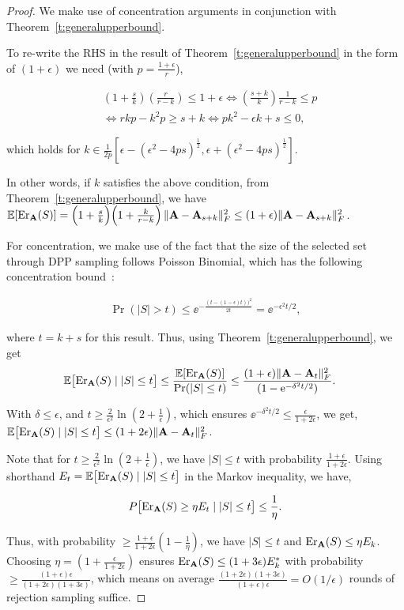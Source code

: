\documentclass{article}
\begin{document}
\begin{proof}
	We make use of concentration arguments in conjunction with Theorem~\ref{t:generalupperbound}. 
	
	To re-write the RHS in the result of Theorem~\ref{t:generalupperbound} in the form of $(1+\epsilon)$ we need (with $p=\frac{1+\epsilon}{r}$),
	
	\begin{align*}
	 & (1 + \frac{s}{k}) (\frac{r}{r-k}) \leq 1+ \epsilon  \iff \left( \frac{s+k}{k} \right) \frac{1}{r-k} \leq p \\ 
	 & \iff rkp - k^2p \geq s + k  \iff pk^2 - \epsilon k + s \leq 0,
	\end{align*}
	
	which holds for $k \in \frac{1}{2p}[ \epsilon - (\epsilon^2 - 4ps )^{\frac{1}{2}}, \epsilon + (\epsilon^2 - 4ps )^{\frac{1}{2}}]$. 
	 
	 In other words, if $k$ satisfies the above condition, from Theorem~\ref{t:generalupperbound}, we have $\mathbb E[\mathrm{Er}_{\mathbf A}(S)] = \Big(1+\frac
	 sk\Big)\Big(1 + \frac{k}{r-k}\Big)\,\|\mathbf A-\mathbf A_{s+k}\|_F^2 \leq (1+\epsilon) \|\mathbf A-\mathbf A_{s+k}\|_F^2$.
	
	For concentration, we make use of the fact that the size of the selected set through DPP sampling follows Poisson Binomial, which has the following concentration bound~\cite{ChungLu2006book}:
	
	\begin{align*}
	\Pr(|S| > t) \leq \ee^{-\frac{(t-(1-\epsilon)t))^2}{2t}} =
	\ee^{-\epsilon^2 t/2},
	\end{align*}
	
	where $t=k+s$ for this result. Thus, using Theorem~\ref{t:generalupperbound}, we get	
	\begin{align*}
	& \mathbb E\big[\mathrm{Er}_{\mathbf A}(S)\mid |S|\leq t\big] \leq \frac{\mathbb E[\mathrm{Er}_{\mathbf A}(S)]}{\mathrm{Pr}(|S|\leq t)} \leq \frac {(1+\epsilon)\| \mathbf A - \mathbf A_{t}\|_F^2}{(1-\mathrm{e}^{-\delta^2t/2}) }.  
	\end{align*}
	
	With $\delta \leq \epsilon$, and $t \geq \frac{2}{\epsilon^2} \ln \left(2 + \frac1{\epsilon} \right)$, which ensures $\ee^{-\delta^2 t/2} \leq \frac{\epsilon}{1+2\epsilon}$, we get, $\mathbb E\big[\mathrm{Er}_{\mathbf A}(S)\mid |S|\leq t\big] \leq (1+2\epsilon) \| \mathbf A - \mathbf A_{t} \|_F^2$.
	
	Note that for $t \geq \frac{2}{\epsilon^2} \ln \left(2 + \frac1{\epsilon} \right)$, we have $|S| \leq t$ with probability $\frac{1+\epsilon}{1+2\epsilon}$. Using shorthand $E_t=\mathbb E\big[\mathrm{Er}_{\mathbf A}(S)\mid |S|\leq t\big]$ in the Markov inequality, we have,
	
	\[ P\big[\mathrm{Er}_{\mathbf A}(S) \geq \eta E_t \mid |S| \leq t \big] \leq \frac{1}{\eta}. \]
	
	Thus, with probability $\geq  \frac{1+\epsilon}{1+2\epsilon} (1 - \frac1{\eta})$, we have $|S| \leq t$ and  $\mathrm{Er}_{\mathbf A}(S) \leq \eta E_k$. Choosing $\eta = (1+\frac \epsilon {1+2\epsilon})$ ensures $\mathrm{Er}_{\mathbf A}(S) \leq (1+3\epsilon)E^*_k$ with probability $\geq  \frac{(1+\epsilon)\epsilon}{(1+2\epsilon)(1+3\epsilon)}$, which means on average $\frac{(1+2\epsilon)(1+3\epsilon)}{(1+\epsilon)\epsilon} = O(1/\epsilon)$ rounds of rejection sampling suffice.
	
	
\end{proof}
\end{document}
